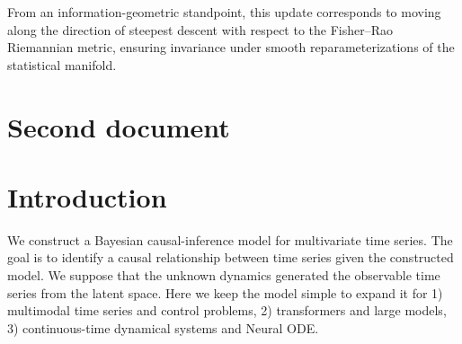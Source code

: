 \documentclass[12pt]{article}
\begin{document}
From an information-geometric standpoint, this update corresponds to moving along the direction of steepest descent with respect to the Fisher–Rao Riemannian metric, ensuring invariance under smooth reparameterizations of the statistical manifold.


\newpage
    \section{Second document}

\section*{Introduction}
We construct a Bayesian causal-inference model for multivariate time series.
The goal is to identify a causal relationship between time series given the constructed model.
We suppose that the unknown dynamics generated the observable time series from the latent space.
Here we keep the model simple to expand it for
    1) multimodal time series and control problems,
    2) transformers and large models,
    3) continuous-time dynamical systems and Neural ODE.
\end{document}
